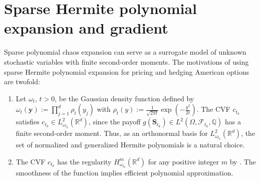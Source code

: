 \documentclass[10pt,a4paper]{amsart}
\numberwithin{equation}{section}
\numberwithin{algorithm}{section}
\theoremstyle{plain}
\theoremstyle{remark}
\newcommand{\R}{\mathbb{R}}
\begin{document}
\section{Sparse Hermite polynomial expansion and gradient}\label{sec:sparse-hermite}
Sparse polynomial chaos expansion can serve as a surrogate model of unknown stochastic variables with finite second-order moments. The motivations of using sparse Hermite polynomial expansion for pricing and hedging American options are twofold:
\begin{enumerate}
    \item Let $\omega_t$, $t>0$, be the Gaussian density function defined by $\omega_t(\mathbf{y}) := \prod_{j=1}^d \rho_{t}(y_j)$ with $\rho_t(y):= \frac{1}{\sqrt{2\pi t}} \exp(-\frac{y^2}{2t})$. The CVF $c_{t_k}$ satisfies $c_{t_k} \in {L}^2_{\omega_{t_k}}(\R^d)$, since the payoff $g(\mathbf{S}_{t_k})\in L^2(\Omega, \mathcal{F}_{t_k}, \mathbb{Q})$ has a finite second-order moment. Thus, as an orthonormal basis for $L^2_{\omega_{t_k}}(\R^d)$, the set of normalized and generalized Hermite polynomials is a natural choice.
    \item The CVF $c_{t_k} $ has the regularity ${H}^m_{\omega_{t_k}}(\R^d)$ for any positive integer $m$ by \cite[Lemmas 4.2 and 4.3]{yang2023optionpricing}. The smoothness of the function implies efficient polynomial approximation.
\end{enumerate}
\end{document}
